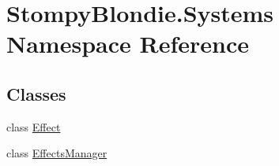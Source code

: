 \hypertarget{namespace_stompy_blondie_1_1_systems}{}\section{Stompy\+Blondie.\+Systems Namespace Reference}
\label{namespace_stompy_blondie_1_1_systems}
\subsection*{Classes}
\begin{DoxyCompactItemize}
\item 
class \mbox{\hyperlink{class_stompy_blondie_1_1_systems_1_1_effect}{Effect}}
\item 
class \mbox{\hyperlink{class_stompy_blondie_1_1_systems_1_1_effects_manager}{Effects\+Manager}}
\end{DoxyCompactItemize}
